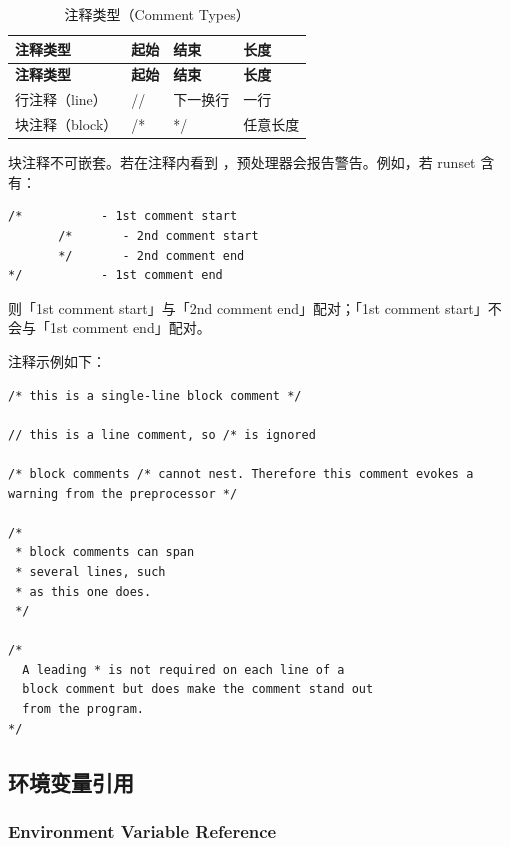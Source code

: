 \begin{longtable}{@{}p{} >{\raggedright\arraybackslash\ttfamily}p{} >{\raggedright\arraybackslash\ttfamily}p{} p{}@{}}
\caption{注释类型（Comment Types）}\label{tab:pxl-comment-types}\\
\toprule
\textbf{\textrm{注释类型}} & \textbf{\textrm{起始}} & \textbf{\textrm{结束}} & \textbf{\textrm{长度}} \\
\midrule
\endfirsthead
\toprule
\textbf{\textrm{注释类型}} & \textbf{\textrm{起始}} & \textbf{\textrm{结束}} & \textbf{\textrm{长度}} \\
\midrule
\endhead
\bottomrule
\endfoot
\textrm{行注释（line）} & // & 下一换行 & 一行 \\
\textrm{块注释（block）} & /* & */ & 任意长度 \\
\end{longtable}

块注释不可嵌套。若在注释内看到 \cmd{*/}，预处理器会报告警告。例如，若 runset 含有：
\begin{lstlisting}[style=pxl]
/*           - 1st comment start
       /*       - 2nd comment start
       */       - 2nd comment end
*/           - 1st comment end
\end{lstlisting}

则「1st comment start」与「2nd comment end」配对；「1st comment start」不会与「1st comment end」配对。

注释示例如下：
\begin{lstlisting}[style=pxl]
/* this is a single-line block comment */

// this is a line comment, so /* is ignored

/* block comments /* cannot nest. Therefore this comment evokes a
warning from the preprocessor */

/*
 * block comments can span
 * several lines, such
 * as this one does.
 */

/*
  A leading * is not required on each line of a
  block comment but does make the comment stand out
  from the program.
*/
\end{lstlisting}

\subsection{环境变量引用}
\subsubsection*{Environment Variable Reference}

